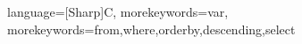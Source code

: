  {
    language=[Sharp]C,
    morekeywords={var},
    morekeywords={from,where,orderby,descending,select} %
}

\newcommand{\CSharp}[3]{
    \kodeprintstyle{#1}{#2}{#3}{CSharp}
}